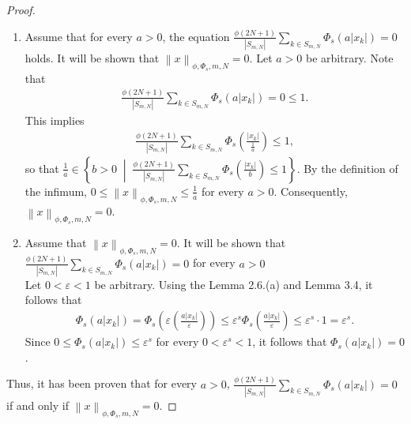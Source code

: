 \documentclass[12pt,a4paper]{article}
\theoremstyle{remark}
\begin{document}
\begin{proof}
    \begin{enumerate}
        \item [$(\Leftarrow)$] Assume that for every $a > 0$, the equation $\frac{\phi\left(2N+1\right)}{\left|S_{m,N}\right|} \sum_{k \in S_{m,N}} \Phi_s\left(a\left|x_k\right|\right) = 0$ holds. It will be shown that $\left\lVert x \right\rVert_{\phi,\Phi_s,m,N} = 0$.
        Let $a > 0$ be arbitrary. Note that 
        \begin{eqnarray*}
            \frac{\phi\left(2N+1\right)}{\left|S_{m,N}\right|} \sum_{k \in S_{m,N}} \Phi_s\left(a\left|x_k\right|\right) = 0 \leq 1.
        \end{eqnarray*}
        This implies 
        \begin{eqnarray*}
            \frac{\phi\left(2N+1\right)}{\left|S_{m,N}\right|} \sum_{k \in S_{m,N}} \Phi_s\left(\frac{\left|x_k\right|}{\frac{1}{a}}\right) \leq 1,
        \end{eqnarray*}
        so that $\frac{1}{a} \in \left\{b > 0 \;\middle|\; \frac{\phi\left(2N+1\right)}{\left|S_{m,N}\right|} \sum_{k \in S_{m,N}} \Phi_s\left(\frac{\left|x_k\right|}{b}\right) \leq 1\right\}$. By the definition of the infimum, $0 \leq \left\lVert x \right\rVert_{\phi,\Phi_s,m,N} \leq \frac{1}{a}$ for every $a > 0$. Consequently, $\left\lVert x \right\rVert_{\phi,\Phi_s,m,N} = 0$.
    
        \item[($\Rightarrow$)] Assume that $\left\lVert x \right\rVert_{\phi,\Phi_s,m,N} = 0$. It will be shown that $\frac{\phi\left(2N+1\right)}{\left|S_{m,N}\right|} \sum_{k \in S_{m,N}} \Phi_s\left(a\left|x_k\right|\right) = 0$ for every $a > 0$\\
        Let $0 < \varepsilon < 1$ be arbitrary. Using the Lemma 2.6.(a) and Lemma 3.4, it follows that 
        \begin{eqnarray*}
            \Phi_s\left(a\left|x_k\right|\right) = \Phi_s\left(\varepsilon\left(\frac{a\left|x_k\right|}{\varepsilon}\right)\right) \leq \varepsilon^s \Phi_s\left(\frac{a\left|x_k\right|}{\varepsilon}\right) \leq \varepsilon^s \cdot 1 = \varepsilon^s.
        \end{eqnarray*}
        Since $0 \leq \Phi_s\left(a\left|x_k\right|\right) \leq \varepsilon^s$ for every $0 < \varepsilon^s < 1$, it follows that $\Phi_s\left(a\left|x_k\right|\right) = 0$. 
    \end{enumerate}
    Thus, it has been proven that for every $a > 0$, $\frac{\phi\left(2N+1\right)}{\left|S_{m,N}\right|} \sum_{k \in S_{m,N}} \Phi_s\left(a\left|x_k\right|\right) = 0$ if and only if $\left\lVert x \right\rVert_{\phi,\Phi_s,m,N} = 0$.
\end{proof}
\end{document}
